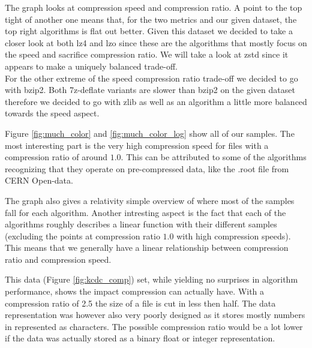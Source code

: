 \documentclass[
	12pt,
	a4paper,
	BCOR10mm,
	DIV14,
	listof=totoc,
	bibliography=totoc,
	headsepline
]{scrreprt}
\begin{document}



The graph looks at compression speed and compression ratio. A point to the top tight of another one means that, for the two metrics and our given dataset, the top right algorithms is flat out better. Given this dataset we decided to take a closer look at both lz4 and lzo since these are the algorithms that mostly focus on the speed and sacrifice compression ratio. We will take a look at zstd since it appears to make a uniquely balanced trade-off. \\
For the other extreme of the speed compression ratio trade-off we decided to go with bzip2. Both 7z-deflate variants are slower than bzip2 on the given dataset therefore we decided to go with zlib as well as an algorithm a little more balanced towards the speed aspect.










Figure \ref{fig:much_color} and \ref{fig:much_color_log} show all of our samples. The most interesting part is the very high compression speed for files with a compression ratio of around $1.0$. This can be attributed to some of the algorithms recognizing that they operate on pre-compressed data, like the .root file from CERN Open-data.

The graph also gives a relativity simple overview of where most of the samples fall for each algorithm.
Another intresting aspect is the fact that each of the algorithms roughly describes a linear function with their different samples (excluding the points at compression ratio $1.0$ with high compression speeds).
This means that we generally have a linear relationship between compression ratio and compression speed.
\FloatBarrier








This data (Figure \ref{fig:kcdc_comp}) set, while yielding no surprises in algorithm performance, shows the impact compression can actually have. With a compression ratio of 2.5 the size of a file is cut in less then half.
The data representation was however also very poorly designed as it stores mostly numbers in represented as characters.
The possible compression ratio would be a lot lower if the data was actually stored as a binary float or integer representation.
\end{document}

